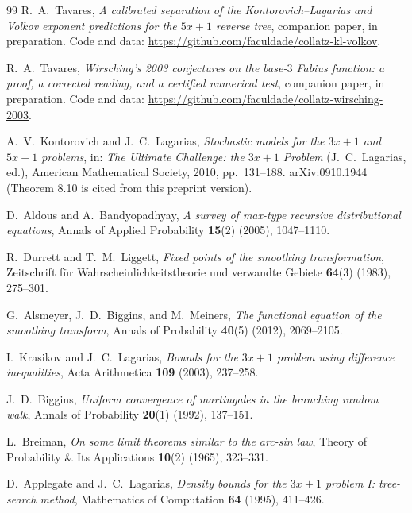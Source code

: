 \documentclass[11pt]{article}
\theoremstyle{definition}
\theoremstyle{remark}
\begin{document}
\begin{thebibliography}{99}
 R.\ A.\ Tavares, \emph{A calibrated
  separation of the Kontorovich--Lagarias and Volkov exponent
  predictions for the $5x+1$ reverse tree}, companion paper, in
  preparation. Code and data:
  \url{https://github.com/faculdade/collatz-kl-volkov}.

 R.\ A.\ Tavares, \emph{Wirsching's 2003
  conjectures on the base-$3$ Fabius function: a proof, a corrected
  reading, and a certified numerical test}, companion paper, in
  preparation. Code and data:
  \url{https://github.com/faculdade/collatz-wirsching-2003}.

 A.\ V.\ Kontorovich and J.\ C.\
  Lagarias, \emph{Stochastic models for the $3x+1$ and $5x+1$
  problems}, in: \emph{The Ultimate Challenge: the $3x+1$ Problem}
  (J.\ C.\ Lagarias, ed.), American Mathematical Society, 2010,
  pp.\ 131--188. arXiv:0910.1944 (Theorem 8.10 is cited from this
  preprint version).

 D.\ Aldous and A.\ Bandyopadhyay,
  \emph{A survey of max-type recursive distributional equations},
  Annals of Applied Probability \textbf{15}(2) (2005), 1047--1110.

 R.\ Durrett and T.\ M.\ Liggett,
  \emph{Fixed points of the smoothing transformation}, Zeitschrift für
  Wahrscheinlichkeitstheorie und verwandte Gebiete \textbf{64}(3)
  (1983), 275--301.

 G.\ Alsmeyer, J.\ D.\ Biggins, and
  M.\ Meiners, \emph{The functional equation of the smoothing
  transform}, Annals of Probability \textbf{40}(5) (2012), 2069--2105.

 I.\ Krasikov and J.\ C.\ Lagarias,
  \emph{Bounds for the $3x+1$ problem using difference inequalities},
  Acta Arithmetica \textbf{109} (2003), 237--258.

 J.\ D.\ Biggins, \emph{Uniform convergence of
  martingales in the branching random walk}, Annals of Probability
  \textbf{20}(1) (1992), 137--151.

 L.\ Breiman, \emph{On some limit theorems similar
  to the arc-sin law}, Theory of Probability \& Its Applications
  \textbf{10}(2) (1965), 323--331.

 D.\ Applegate and J.\ C.\ Lagarias,
  \emph{Density bounds for the $3x+1$ problem I: tree-search method},
  Mathematics of Computation \textbf{64} (1995), 411--426.


\end{thebibliography}
\end{document}
